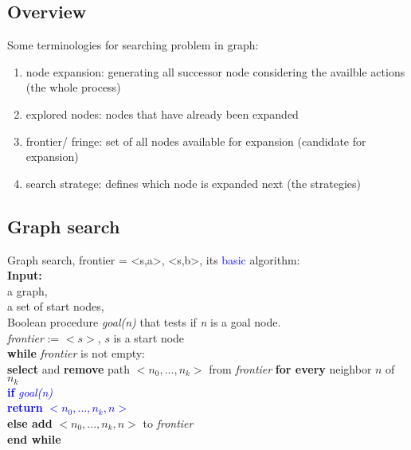 \subsection{Overview}
Some terminologies for searching problem in graph:
\begin{enumerate}
    \item node expansion: generating all successor node considering the availble actions (the whole process)
    \item explored nodes: nodes that have already been expanded
    \item frontier/ fringe: set of all nodes available for expansion (candidate for expansion)
    \item search stratege: defines which node is expanded next (the strategies)
\end{enumerate}

\noindent
\subsection{Graph search}
Graph search, frontier = {<s,a>, <s,b>}, its \textcolor{blue}{basic} algorithm: \\
\textbf{Input:} \\
\tabto{5mm} a graph, \\
\tabto{5mm} a set of start nodes, \\
\tabto{5mm} Boolean procedure \emph{goal(n)} that tests if \emph{n} is a goal node. \\
\emph{frontier} := {$<s>$, $s$ is a start node} \\
\textbf{while} \emph{frontier} is not empty: \\
\tabto{5mm} \textbf{select} and \textbf{remove} path $<n_{0},...,n_{k}>$ from \emph{frontier} \textbf{for every} neighbor $n$ of $n_{k}$ \\
\tabto{10mm} \textcolor{blue}{\textbf{if} \emph{goal(n)}} \\
\tabto{15mm} \textcolor{blue}{\textbf{return} $<n_{0},...,n_{k},n>$} \\
\tabto{10mm} \textbf{else add} $<n_{0},...,n_{k},n>$ to \emph{frontier} \\
\textbf{end while} \\

